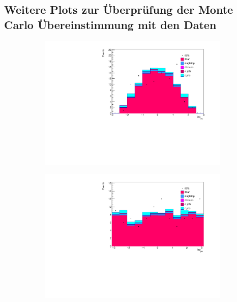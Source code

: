 \subsection{Weitere Plots zur Überprüfung der Monte Carlo Übereinstimmung mit den 
Daten}
\label{sec:stackedrest}


\begin{figure}[H]
  \begin{subfigure}{0.5\textwidth}
    \centering
    \includegraphics[width=\linewidth]{plots_and_txt/stacked_plots/stacked_lep_eta.pdf}
    \caption{}
    \label{fig:stacked_lep_pt2}
  \end{subfigure}%
  \begin{subfigure}{0.5\textwidth}
    \centering
    \includegraphics[width=\linewidth]{plots_and_txt/stacked_plots/stacked_lep_phi.pdf}

\end{subfigure}
\end{figure}
